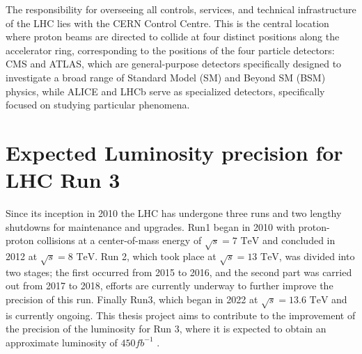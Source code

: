 The responsibility for overseeing all controls, services, and technical infrastructure of the LHC lies with the CERN Control Centre. This is the central location where proton beams are directed to collide at four distinct positions along the accelerator ring, corresponding to the positions of the four particle detectors: CMS and ATLAS, which are general-purpose detectors specifically designed to investigate a broad range of Standard Model (SM) and Beyond SM (BSM) physics, while ALICE and LHCb serve as specialized detectors, specifically focused on studying particular phenomena.


\section{Expected  Luminosity precision for LHC Run 3}

Since its inception in 2010 the LHC has undergone three runs and two lengthy shutdowns for maintenance and upgrades. 
Run1 began in 2010 with proton-proton collisions at a center-of-mass energy of $\sqrt{s}=\text{7 TeV}$ and concluded in 2012 at  $\sqrt{s}=\text{8 TeV}$. Run 2, which took place at $\sqrt{s}=\text{13 TeV}$, was divided into two stages; the first  occurred from 2015 to 2016, and the second part  was carried out   from 2017 to 2018, efforts are currently underway to further improve the precision of this run. Finally  Run3, which began in 2022 at $\sqrt{s}=\text{13.6 TeV}$ and is currently ongoing. This thesis project aims to contribute to the improvement of the precision of the luminosity for Run 3, where it is expected to obtain an approximate luminosity of $450 fb^{-1}$ \cite{
hl-lhc}. \\

